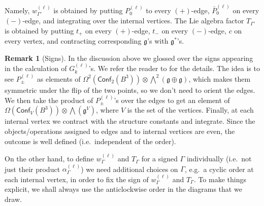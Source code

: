 \documentclass[a4paper]{amsart}
\theoremstyle{plain}
\theoremstyle{definition}
\newtheorem*{rem}{Remark}
\newcommand{\on}{\operatorname}
\newcommand{\g}{\mathfrak{g}}
\newcommand{\bw}{{\textstyle\bigwedge}}
\newcommand{\cf}{\mathsf{Conf}}
\begin{document}
Namely, $w^{(\ell)}_{\Gamma'}$ is obtained by putting $P^{(\ell)}_0$ to every  $(+)$-edge, $\bar P^{(\ell)}_0$ on every  $(-)$-edge, and integrating over the internal vertices. The Lie algebra factor $T_{\Gamma'}$ is obtained by putting $t_+$ on every $(+)$-edge, $t_-$ on every $(-)$-edge, $c$ on every vertex, and contracting corresponding $\g$'s with $\g^*$'s.

\begin{rem}[Signs] 
In the discussion above we glossed over the signs appearing in the calculation of $G_k^{(\ell)}$'s. 
We  refer the reader to \cite{AS} for the details. The idea is to see $P_\pm^{(\ell)}$ as elements of $\Omega^2(\cf_2(B^3))\otimes\bw^2(\g\oplus\g)$, which makes them symmetric under the flip of the two points, so we don't need to orient the edges. We then take the product of $P_\pm^{(\ell)}$'s over the edges to get an element of $\Omega(\cf_V(B^3))\otimes\bw(\g^V)$, where $V$ is the set of the vertices. Finally, at each internal vertex we contract with the structure constants and integrate. Since the objects/operations assigned to edges and to internal vertices are even, the outcome is well defined (i.e.\ independent of the order).

On the other hand, to define $w^{(\ell)}_{\Gamma}$ and $T_{\Gamma}$ for a signed $\Gamma$ individually (i.e.\ not just their product $\alpha^{(\ell)}_{\Gamma}$) we need additional choices on $\Gamma$, e.g.\ a cyclic order at each internal vertex, in order to fix the sign of $w^{(\ell)}_{\Gamma}$ and $T_{\Gamma}$. To make things explicit, we shall always use the anticlockwise order in the diagrams that we draw.
\end{rem}

\end{document}
